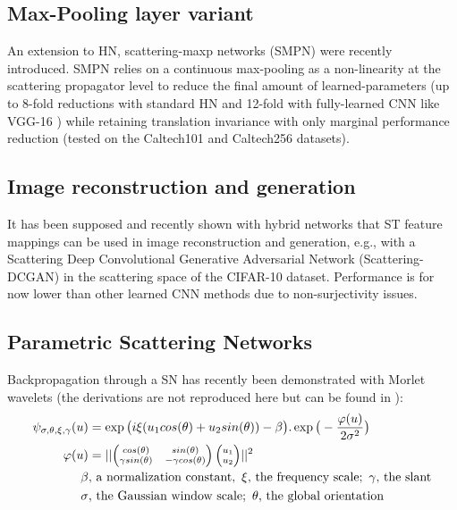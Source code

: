 \documentclass[runningheads]{llncs}
\begin{document}
\subsection{Max-Pooling layer variant}

An extension to HN, scattering-maxp networks (SMPN) were recently introduced\cite{DSN}. SMPN relies on a continuous max-pooling as a non-linearity at the scattering propagator level to reduce the final amount of learned-parameters (up to 8-fold reductions with standard HN and 12-fold with fully-learned CNN like VGG-16 \cite{vgg}) while retaining translation invariance with only marginal performance reduction (tested on the Caltech101 and Caltech256\cite{caltech256} datasets).

\subsection{Image reconstruction and generation}

It has been supposed\cite{brunathesis}\cite{brunasynthesis}\cite{brunainverse} and recently shown with hybrid networks\cite{oyallon} that ST feature mappings can be used in image reconstruction and generation, e.g., with a Scattering Deep Convolutional Generative Adversarial Network (Scattering-DCGAN) in the scattering space of the CIFAR-10 dataset\cite{cifar}. Performance is for now lower than other learned CNN methods due to non-surjectivity issues.

\subsection{Parametric Scattering Networks}

Backpropagation through a SN has recently been demonstrated with Morlet wavelets (the derivations are not reproduced here but can be found in \cite{parametric}):
\begin{align}
\psi_{\sigma, \theta, \xi, \gamma}(u) &= \exp\big(i\xi(u_1cos(\theta) + u_2sin(\theta))-\beta\big).\exp\big(-\frac{\varphi(u)}{2\sigma^2}\big) \\
\varphi(u) &= ||\scriptsize{\begin{pmatrix} cos(\theta) & sin(\theta) \\ \gamma sin(\theta) & -\gamma cos(\theta) \end{pmatrix}\begin{pmatrix} u_1 \\ u_2 \end{pmatrix}}||^2\\
\beta&,\,\text{a normalization constant},\,\,\xi,\,\text{the frequency scale};\,\,\gamma,\,\text{the slant}\notag\\
\sigma&,\,\text{the Gaussian window scale};\,\,\theta,\,\text{the global orientation}\notag
\end{align}
\end{document}
